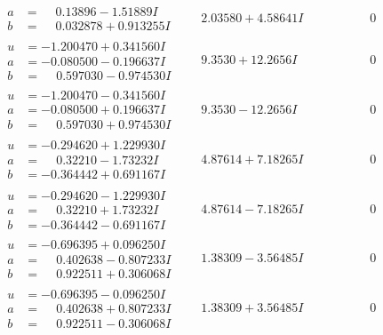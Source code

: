 \documentclass[1p]{elsarticle_modified}
\theoremstyle{definition}
\begin{document}
$$\begin{array}{c|c|c}
\begin{aligned}
a &= \phantom{-}0.13896 - 1.51889 I \\
b &= \phantom{-}0.032878 + 0.913255 I\end{aligned}
 & \phantom{-}2.03580 + 4.58641 I & \phantom{-0.000000 } 0 \\ \hline\begin{aligned}
u &= -1.200470 + 0.341560 I \\
a &= -0.080500 - 0.196637 I \\
b &= \phantom{-}0.597030 - 0.974530 I\end{aligned}
 & \phantom{-}9.3530 + 12.2656 I & \phantom{-0.000000 } 0 \\ \hline\begin{aligned}
u &= -1.200470 - 0.341560 I \\
a &= -0.080500 + 0.196637 I \\
b &= \phantom{-}0.597030 + 0.974530 I\end{aligned}
 & \phantom{-}9.3530 - 12.2656 I & \phantom{-0.000000 } 0 \\ \hline\begin{aligned}
u &= -0.294620 + 1.229930 I \\
a &= \phantom{-}0.32210 - 1.73232 I \\
b &= -0.364442 + 0.691167 I\end{aligned}
 & \phantom{-}4.87614 + 7.18265 I & \phantom{-0.000000 } 0 \\ \hline\begin{aligned}
u &= -0.294620 - 1.229930 I \\
a &= \phantom{-}0.32210 + 1.73232 I \\
b &= -0.364442 - 0.691167 I\end{aligned}
 & \phantom{-}4.87614 - 7.18265 I & \phantom{-0.000000 } 0 \\ \hline\begin{aligned}
u &= -0.696395 + 0.096250 I \\
a &= \phantom{-}0.402638 - 0.807233 I \\
b &= \phantom{-}0.922511 + 0.306068 I\end{aligned}
 & \phantom{-}1.38309 - 3.56485 I & \phantom{-0.000000 } 0 \\ \hline\begin{aligned}
u &= -0.696395 - 0.096250 I \\
a &= \phantom{-}0.402638 + 0.807233 I \\
b &= \phantom{-}0.922511 - 0.306068 I\end{aligned}
 & \phantom{-}1.38309 + 3.56485 I & \phantom{-0.000000 } 0\\

\end{array}$$
\end{document}
